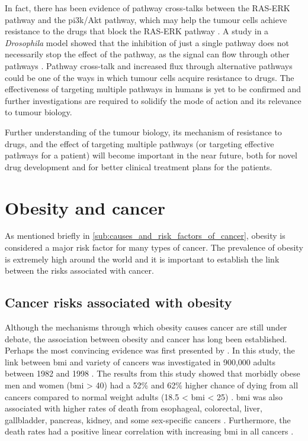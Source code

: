 In fact, there has been evidence of pathway cross-talks between the RAS-ERK pathway and the \gls{pi3k}/Akt pathway, which may help the tumour cells achieve resistance to the  drugs that block the RAS-ERK pathway \citep{Moelling2002,Zimmermann1999a}.
A study in a \textit{Drosophila} model showed that the inhibition of just a single pathway does not necessarily stop the effect of the pathway, as the signal can flow through other pathways \citep{Dar2012}.
Pathway cross-talk and increased flux through alternative pathways could be one of the ways in which tumour cells acquire resistance to drugs.
The effectiveness of targeting multiple pathways in humans is yet to be confirmed and further investigations are required to solidify the mode of action and its relevance to tumour biology.

Further understanding of the tumour biology, its mechanism of resistance to drugs, and the effect of targeting multiple pathways (or targeting effective pathways for a patient) will become important in the near future, both for novel drug development and for better clinical treatment plans for the patients.

\section{Obesity and cancer}
\label{sec:obesity_and_cancer}

As mentioned briefly in \cref{sub:causes_and_risk_factors_of_cancer}, obesity is considered a major risk factor for many types of cancer.
The prevalence of obesity is extremely high around the world and  it is important to establish the link between the risks associated with cancer.

\subsection{Cancer risks associated with obesity}
\label{sub:cancer_risks_associated_with_obesity}

Although the mechanisms through which obesity causes cancer are still under debate, the association between obesity and cancer has long been established.
Perhaps the most convincing evidence was first presented by \citet{Calle2003}.
In this study, the link between \gls{bmi} and variety of cancers was investigated in 900,000 adults between 1982 and 1998 \citep{Calle2003}.
The results from this study showed that morbidly obese men and women (\gls{bmi} \textgreater{} 40) had a 52\% and 62\% higher chance of dying from all cancers compared to normal weight adults (18.5 \textless{} \gls{bmi} \textless{} 25) \citep{Calle2003}.
\gls{bmi} was also associated with higher rates of death from esophageal, colorectal, liver, gallbladder, pancreas, kidney, and some sex-specific cancers \citep{Calle2003}.
Furthermore, the death rates had a positive linear correlation with increasing \gls{bmi} in all cancers \citep{Calle2003}.

